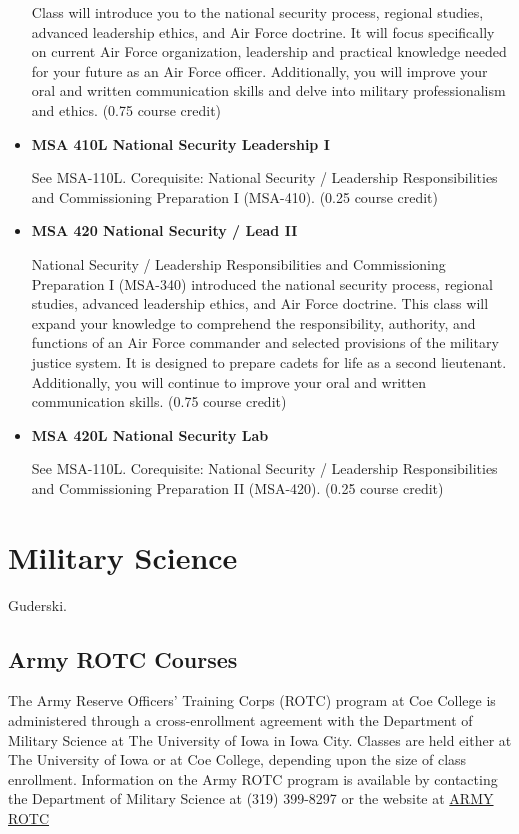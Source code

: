\documentclass[
  letterpaper,
]{scrbook}
\begin{document}
\begin{itemize}
  Class will introduce you to the national security process, regional
  studies, advanced leadership ethics, and Air Force doctrine. It will
  focus specifically on current Air Force organization, leadership and
  practical knowledge needed for your future as an Air Force officer.
  Additionally, you will improve your oral and written communication
  skills and delve into military professionalism and ethics. (0.75
  course credit)
\item
  \textbf{MSA 410L National Security Leadership I}

  See MSA-110L. Corequisite: National Security / Leadership
  Responsibilities and Commissioning Preparation I (MSA-410). (0.25
  course credit)
\item
  \textbf{MSA 420 National Security / Lead II}

  National Security / Leadership Responsibilities and Commissioning
  Preparation I (MSA-340) introduced the national security process,
  regional studies, advanced leadership ethics, and Air Force doctrine.
  This class will expand your knowledge to comprehend the
  responsibility, authority, and functions of an Air Force commander and
  selected provisions of the military justice system. It is designed to
  prepare cadets for life as a second lieutenant. Additionally, you will
  continue to improve your oral and written communication skills. (0.75
  course credit)
\item
  \textbf{MSA 420L National Security Lab}

  See MSA-110L. Corequisite: National Security / Leadership
  Responsibilities and Commissioning Preparation II (MSA-420). (0.25
  course credit)
\end{itemize}

\hypertarget{military-science}{%
\section{Military Science}\label{military-science}}

Guderski.

\hypertarget{army-rotc-courses}{%
\subsection{Army ROTC Courses}\label{army-rotc-courses}}

The Army Reserve Officers' Training Corps (ROTC) program at Coe College
is administered through a cross-enrollment agreement with the Department
of Military Science at The University of Iowa in Iowa City. Classes are
held either at The University of Iowa or at Coe College, depending upon
the size of class enrollment. Information on the Army ROTC program is
available by contacting the Department of Military Science at (319)
399-8297 or the website at
\href{http://armyrotc.com/edu/univia/index.htm}{ARMY ROTC}
\end{document}
